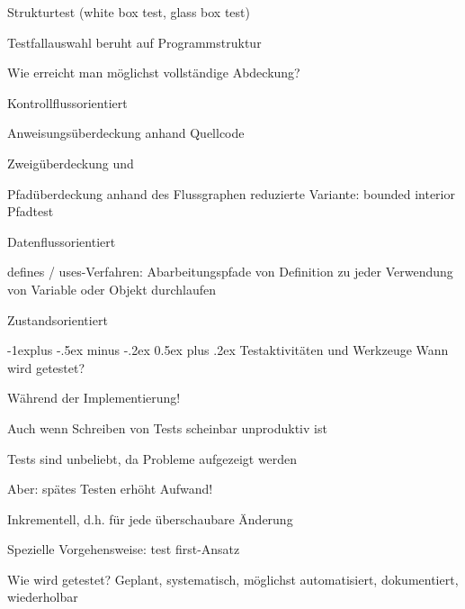 \documentclass[a4paper]{article}
\makeatletter
\renewcommand{\subsection}{\@startsection{subsection}{2}{0mm}%
                                {-1explus -.5ex minus -.2ex}%
                                {0.5ex plus .2ex}%
                                {\normalfont\normalsize\bfseries}}
\makeatother
\begin{document}
\begin{multicols}{3}
  Strukturtest (white box test, glass box test)
  \begin{itemize*}
    \item Testfallauswahl beruht auf Programmstruktur
    \item Wie erreicht man möglichst vollständige Abdeckung?
    \item Kontrollflussorientiert
          \begin{itemize*}
            \item Anweisungsüberdeckung anhand Quellcode
            \item Zweigüberdeckung und
            \item Pfadüberdeckung anhand des Flussgraphen reduzierte Variante: bounded interior Pfadtest
          \end{itemize*}
    \item Datenflussorientiert
          \begin{itemize*}
            \item defines / uses-Verfahren: Abarbeitungspfade von Definition zu jeder Verwendung von Variable oder Objekt durchlaufen
          \end{itemize*}
    \item Zustandsorientiert
  \end{itemize*}

  \subsection{Testaktivitäten und Werkzeuge}
  Wann wird getestet?
  \begin{itemize*}
    \item Während der Implementierung!
          \begin{itemize*}
            \item Auch wenn Schreiben von Tests scheinbar unproduktiv ist
            \item Tests sind unbeliebt, da Probleme aufgezeigt werden
            \item Aber: spätes Testen erhöht Aufwand!
          \end{itemize*}
    \item Inkrementell, d.h. für jede überschaubare Änderung
    \item Spezielle Vorgehensweise: test first-Ansatz
  \end{itemize*}

  Wie wird getestet? Geplant, systematisch, möglichst automatisiert, dokumentiert, wiederholbar


\end{multicols}
\end{document}
